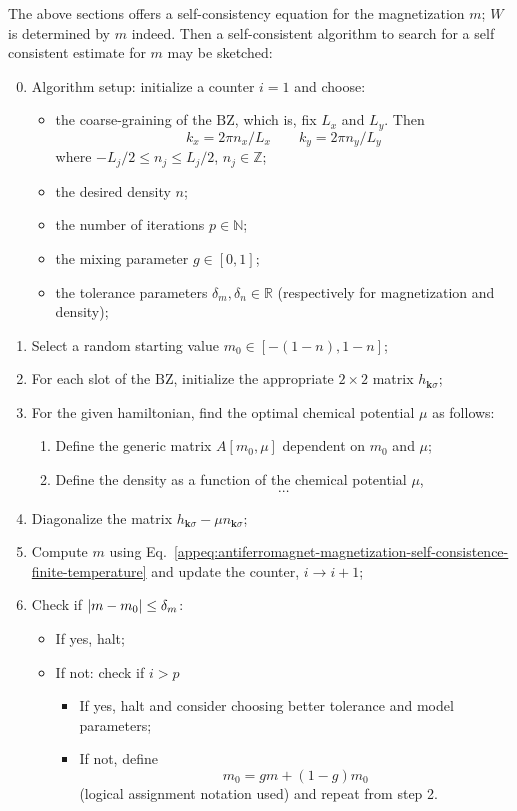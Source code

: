 The above sections offers a self-consistency equation for the magnetization $m$; $W$ is determined by $m$ indeed. Then a self-consistent algorithm to search for a self consistent estimate for $m$ may be sketched:
\begin{enumerate}
	\setcounter{enumi}{-1}
	\item Algorithm setup: initialize a counter $i=1$ and choose:
	\begin{itemize}
		\item the coarse-graining of the $\mathrm{BZ}$, which is, fix $L_x$ and $L_y$. Then 
		\[ 
			k_x = 2\pi n_x/L_x
			\qquad
			k_y = 2\pi n_y/L_y 
		\]
		where $-L_j/2 \le n_j \le L_j/2$, $n_j \in \mathbb{Z}$;
		\item the desired density $n$;
		\item the number of iterations $p \in \mathbb{N}$; 
		\item the mixing parameter $g \in [0,1]$;
		\item the tolerance parameters $\delta_m, \delta_n \in \mathbb{R}$ (respectively for magnetization and density);
	\end{itemize}
	\item Select a random starting value $m_0 \in [-(1-n),1-n]$;
	\item For each slot of the $\mathrm{BZ}$, initialize the appropriate $2\times2$ matrix $h_{\mathbf{k}\sigma}$;
	\item For the given hamiltonian, find the optimal chemical potential $\mu$ as follows:
	\begin{enumerate}
		\item Define the generic matrix $A[m_0, \mu]$ dependent on $m_0$ and $\mu$;
		\item Define the density as a function of the chemical potential $\mu$,
		\[
			\cdots
		\]
	\end{enumerate}
	\item Diagonalize the matrix $h_{\mathbf{k}\sigma} - \mu n_{\mathbf{k}\sigma}$;
	\item Compute $m$ using Eq.~\eqref{appeq:antiferromagnet-magnetization-self-consistence-finite-temperature} and update the counter, $i \to i+1$;
	\item Check if $\abs{m-m_0} \le \delta_m$:
	\begin{itemize}
		\item If yes, halt;
		\item If not: check if $i > p$
		\begin{itemize}
			\item If yes, halt and consider choosing better tolerance and model parameters;
			\item If not, define 
			\[
				m_0 = gm + (1-g)m_0
			\]
			(logical assignment notation used) and repeat from step 2.
		\end{itemize}
	\end{itemize}
\end{enumerate}
{\color{tabred}}
\todo

